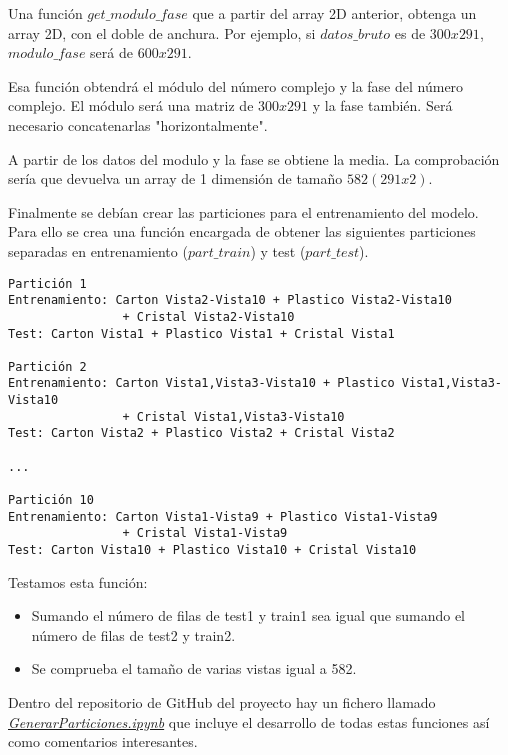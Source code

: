 
Una función \textit{$get\_modulo\_fase$} que a partir del array 2D anterior, obtenga un array 2D, con el doble de anchura. Por ejemplo, si \textit{$datos\_bruto$} es de $300 x 291$, $modulo\_fase$ será de $600 x 291$. 

Esa función obtendrá el módulo del número complejo y la fase del número complejo. El módulo será una matriz de $300 x 291$ y la fase también.  Será necesario concatenarlas "horizontalmente". 



A partir de los datos del modulo y la fase se obtiene la media. La comprobación sería que devuelva un array de 1 dimensión de tamaño $582 (291 x 2)$.


Finalmente se debían crear las particiones para el entrenamiento del modelo. Para ello se crea una función encargada de obtener las siguientes particiones separadas en entrenamiento ($part\_train$) y test ($part\_test$).

\begin{verbatim}
Partición 1
Entrenamiento: Carton Vista2-Vista10 + Plastico Vista2-Vista10 
				+ Cristal Vista2-Vista10
Test: Carton Vista1 + Plastico Vista1 + Cristal Vista1

Partición 2
Entrenamiento: Carton Vista1,Vista3-Vista10 + Plastico Vista1,Vista3-Vista10 
				+ Cristal Vista1,Vista3-Vista10
Test: Carton Vista2 + Plastico Vista2 + Cristal Vista2

...

Partición 10
Entrenamiento: Carton Vista1-Vista9 + Plastico Vista1-Vista9 
				+ Cristal Vista1-Vista9
Test: Carton Vista10 + Plastico Vista10 + Cristal Vista10

\end{verbatim}

Testamos esta función:
\begin{itemize}
\item Sumando el número de filas de test1 y train1 sea igual que sumando el número de filas de test2 y train2.
\item Se comprueba el tamaño de varias vistas igual a 582.
\end{itemize}
  

Dentro del repositorio de GitHub del proyecto hay un fichero llamado \href{https://github.com/mecyc/TFG_RADAR_60GHZ/blob/main/scripts/GenerarParticiones.ipynb}{\textit{GenerarParticiones.ipynb}} que incluye el desarrollo de todas estas funciones así como comentarios interesantes.

